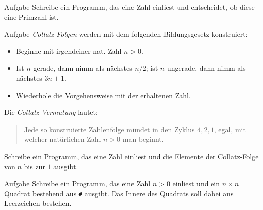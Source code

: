 \documentclass[
  aspectratio=1610,
]{beamer}
\begin{document}
\begin{frame}
  \begin{block}{Aufgabe}
    Schreibe ein Programm, das eine Zahl einliest und entscheidet, ob diese eine Primzahl
    ist.
  \end{block}

  \begin{block}{Aufgabe}
    \emph{Collatz-Folgen} werden mit dem folgenden Bildungsgesetz konstruiert:
    \begin{itemize}
      \item Beginne mit irgendeiner nat. Zahl $n>0$.
      \item Ist $n$ gerade, dann nimm als nächstes $n / 2$;
        ist $n$ ungerade, dann nimm als nächstes $3n + 1$.
      \item Wiederhole die Vorgehensweise mit der erhaltenen Zahl.
    \end{itemize}
    Die \emph{Collatz-Vermutung} lautet:
    \begin{quote}
      Jede so konstruierte Zahlenfolge mündet in den Zyklus $4, 2, 1$, egal, mit welcher
      natürlichen Zahl $n>0$ man beginnt.
    \end{quote}
    Schreibe ein Programm, das eine Zahl einliest und die Elemente der Collatz-Folge von
    $n$ bis zur $1$ ausgibt.
  \end{block}

  \begin{block}{Aufgabe}
    Schreibe ein Programm, das eine Zahl $n > 0$ einliest und ein $n \times n$ Quadrat
    bestehend aus \texttt{\#} ausgibt. Das Innere des Quadrats soll dabei aus Leerzeichen
    bestehen.
  \end{block}
\end{frame}
\end{document}
